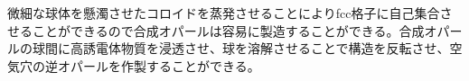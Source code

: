 \documentclass[platex,dvipdfmx,draft]{jsreport}
\numberwithin{equation}{section}
\begin{document}
微細な球体を懸濁させたコロイドを蒸発させることによりfcc格子に自己集合させることができるので合成オパールは容易に製造することができる。合成オパールの球間に高誘電体物質を浸透させ、球を溶解させることで構造を反転させ、空気穴の逆オパールを作製することができる。








\end{document}
